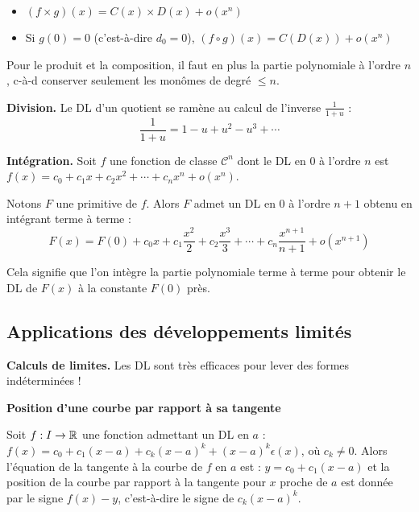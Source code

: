 \documentclass[10pt,class=article,crop=false]{standalone}
\begin{document}
\begin{multicols}{2}
\begin{proposition}
\begin{itemize}
		\item $(f \times g)(x) = C(x) \times D(x) + o(x^n)$ 
		
		\item Si $g(0)=0$ (c'est-à-dire $d_0=0$),
		$(f \circ g)(x) = C(D(x)) + o(x^n)$ 
	\end{itemize}
\end{proposition}

Pour le produit et la composition, il faut en plus 
 la partie polynomiale à l'ordre $n$, c-à-d conserver seulement
les monômes de degré $\le n$.


\textbf{Division.}
Le DL d'un quotient se ramène au calcul de l'inverse $\frac{1}{1+u}$ :
$$\frac{1}{1+u} = 1-u+u^2-u^3+\cdots$$

\textbf{Intégration.}
Soit $f$ une fonction de classe $\mathcal{C}^n$ dont le DL
en $0$ à l'ordre $n$ est $f(x)=c_0+c_1x+c_2x^2+\cdots+c_nx^n+o(x^n)$.
\begin{theoreme}
	Notons $F$ une primitive de $f$.
	Alors $F$ admet un DL en $0$ à l'ordre $n+1$ obtenu en intégrant terme à terme :
$$
		F(x)=F(0)+c_0 x + c_1\frac{x^2}{2}+ c_2\frac{x^3}{3}+\cdots 
		 +c_n\frac{x^{n+1}}{n+1}+o(x^{n+1})  
$$
\end{theoreme}

Cela signifie que l'on intègre la partie polynomiale terme à terme pour obtenir le DL de $F(x)$ à la constante $F(0)$ près.





\subsection{Applications des développements limités}


\textbf{Calculs de limites.} 
Les DL sont très efficaces pour lever des formes indéterminées !

\textbf{Position d'une courbe par rapport à sa tangente}

\begin{proposition}
	Soit $f : I \to \mathbb{R}$ une fonction admettant un DL en $a$ :
	$f(x)=c_0+c_1(x-a)+c_k(x-a)^k+(x-a)^k\epsilon(x)$,
	où $c_k \neq 0$.
	Alors l'équation de la tangente à la courbe de $f$ en $a$ est : $y=c_0+c_1(x-a)$ et
	la position de la courbe par rapport à la tangente pour $x$ proche de $a$ est
	donnée par le signe $f(x)-y$, c'est-à-dire le signe de $c_k(x-a)^k$.
\end{proposition}



\end{multicols}
\end{document}
